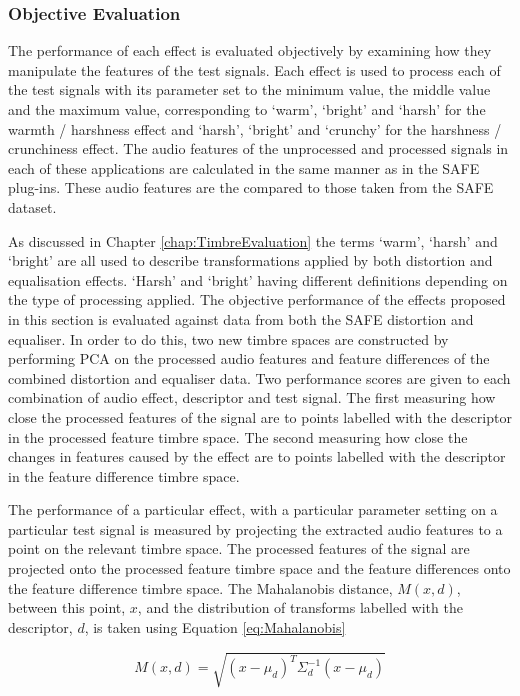 		\subsubsection*{Objective Evaluation}
			The performance of each effect is evaluated objectively by examining how they manipulate the
			features of the test signals. Each effect is used to process each of the test signals with its
			parameter set to the minimum value, the middle value and the maximum value, corresponding to `warm',
			`bright' and `harsh' for the warmth / harshness effect and `harsh', `bright' and `crunchy' for the
			harshness / crunchiness effect. The audio features of the unprocessed and processed signals in each
			of these applications are calculated in the same manner as in the SAFE plug-ins. These audio
			features are the compared to those taken from the SAFE dataset.

			As discussed in Chapter \ref{chap:TimbreEvaluation} the terms `warm', `harsh' and `bright' are all
			used to describe transformations applied by both distortion and equalisation effects. `Harsh' and
			`bright' having different definitions depending on the type of processing applied. The objective
			performance of the effects proposed in this section is evaluated against data from both the SAFE
			distortion and equaliser. In order to do this, two new timbre spaces are constructed by performing
			PCA on the processed audio features and feature differences of the combined distortion and equaliser
			data. Two performance scores are given to each combination of audio effect, descriptor and test
			signal. The first measuring how close the processed features of the signal are to points labelled
			with the descriptor in the processed feature timbre space.  The second measuring how close the
			changes in features caused by the effect are to points labelled with the descriptor in the feature
			difference timbre space.

			The performance of a particular effect, with a particular parameter setting on a particular test
			signal is measured by projecting the extracted audio features to a point on the relevant timbre
			space. The processed features of the signal are projected onto the processed feature timbre space
			and the feature differences onto the feature difference timbre space. The Mahalanobis distance,
			$M(x, d)$, between this point, $x$, and the distribution of transforms labelled with the descriptor,
			$d$, is taken using Equation \ref{eq:Mahalanobis}
			
			\begin{equation}
				M(x, d) = \sqrt{(x - \mu_{d})^{T}\Sigma_{d}^{-1}(x - \mu_{d})}
				\label{eq:Mahalanobis}
			\end{equation}


